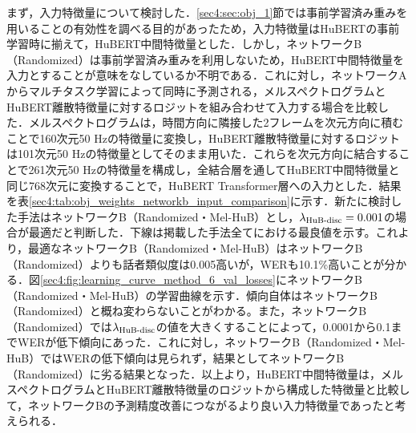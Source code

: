 まず，入力特徴量について検討した．\ref{sec4:sec:obj_1}節では事前学習済み重みを用いることの有効性を調べる目的があったため，入力特徴量はHuBERTの事前学習時に揃えて，HuBERT中間特徴量とした．しかし，ネットワークB（Randomized）は事前学習済み重みを利用しないため，HuBERT中間特徴量を入力とすることが意味をなしているか不明である．これに対し，ネットワークAからマルチタスク学習によって同時に予測される，メルスペクトログラムとHuBERT離散特徴量に対するロジットを組み合わせて入力する場合を比較した．メルスペクトログラムは，時間方向に隣接した2フレームを次元方向に積むことで160次元50 Hzの特徴量に変換し，HuBERT離散特徴量に対するロジットは101次元50 Hzの特徴量としてそのまま用いた．これらを次元方向に結合することで261次元50 Hzの特徴量を構成し，全結合層を通してHuBERT中間特徴量と同じ768次元に変換することで，HuBERT Transformer層への入力とした．結果を表\ref{sec4:tab:obj_weights_networkb_input_comparison}に示す．新たに検討した手法はネットワークB（Randomized・Mel-HuB）とし，$\lambda_{\text{HuB-disc}} = 0.001$の場合が最適だと判断した．下線は掲載した手法全てにおける最良値を示す。これより，最適なネットワークB（Randomized・Mel-HuB）はネットワークB（Randomized）よりも話者類似度は0.005高いが，WERも10.1\%高いことが分かる．図\ref{sec4:fig:learning_curve_method_6_val_losses}にネットワークB（Randomized・Mel-HuB）の学習曲線を示す．傾向自体はネットワークB（Randomized）と概ね変わらないことがわかる。また，ネットワークB（Randomized）では$\lambda_{\text{HuB-disc}}$の値を大きくすることによって，0.0001から0.1までWERが低下傾向にあった．これに対し，ネットワークB（Randomized・Mel-HuB）ではWERの低下傾向は見られず，結果としてネットワークB（Randomized）に劣る結果となった．以上より，HuBERT中間特徴量は，メルスペクトログラムとHuBERT離散特徴量のロジットから構成した特徴量と比較して，ネットワークBの予測精度改善につながるより良い入力特徴量であったと考えられる．

